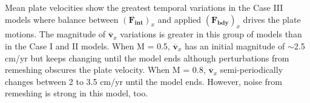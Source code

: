 \documentclass[letterpaper,12pt,notitle]{memphisthesis}                     %
\begin{document}
%

Mean plate velocities show the greatest temporal variations in the Case III models where balance between $(\boldsymbol{F_{int}})_x$ and applied $(\boldsymbol{F_{bdy}})_x$ drives the plate motions. The magnitude of $\overline{\boldsymbol{v}}_{x}$ variations is greater in this group of models than in the Case I and II models. When M = 0.5, $\overline{\boldsymbol{v}}_{x}$ has an initial magnitude of $\sim$2.5 cm/yr but keeps changing until the model ends although perturbations from remeshing obscures the plate velocity. When M = 0.8, $\overline{\boldsymbol{v}}_{x}$ semi-periodically changes between 2 to 3.5 cm/yr until the model ends. However, noise from remeshing is strong in this model, too. 

\end{document}
